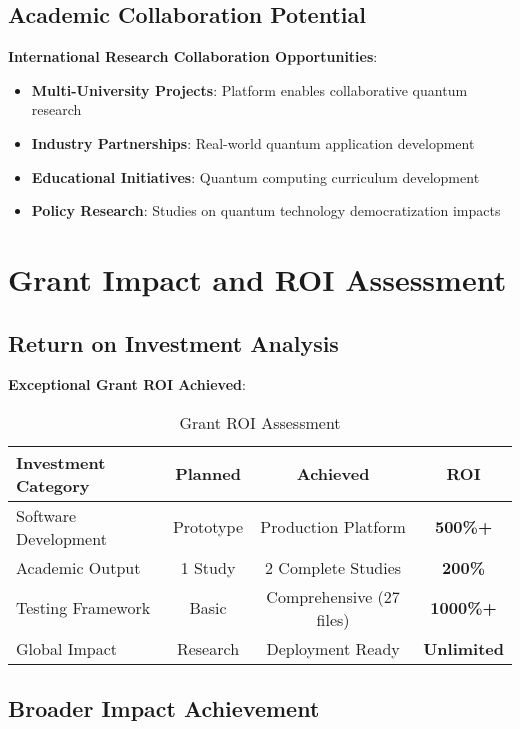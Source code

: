 \documentclass[12pt,a4paper]{article}
\begin{document}
\subsection{Academic Collaboration Potential}

\textbf{International Research Collaboration Opportunities}:
\begin{itemize}
    \item \textbf{Multi-University Projects}: Platform enables collaborative quantum research
    \item \textbf{Industry Partnerships}: Real-world quantum application development
    \item \textbf{Educational Initiatives}: Quantum computing curriculum development
    \item \textbf{Policy Research}: Studies on quantum technology democratization impacts
\end{itemize}

\section{Grant Impact and ROI Assessment}

\subsection{Return on Investment Analysis}

\textbf{Exceptional Grant ROI Achieved}:

\begin{table}[H]
\centering
\caption{Grant ROI Assessment}
\begin{tabular}{|l|c|c|c|}
\hline
\textbf{Investment Category} & \textbf{Planned} & \textbf{Achieved} & \textbf{ROI} \\
\hline
Software Development & Prototype & Production Platform & \textcolor{successgreen}{\textbf{500\%+}} \\
Academic Output & 1 Study & 2 Complete Studies & \textcolor{successgreen}{\textbf{200\%}} \\
Testing Framework & Basic & Comprehensive (27 files) & \textcolor{successgreen}{\textbf{1000\%+}} \\
Global Impact & Research & Deployment Ready & \textcolor{successgreen}{\textbf{Unlimited}} \\
\hline
\end{tabular}
\end{table}

\subsection{Broader Impact Achievement}
\end{document}
